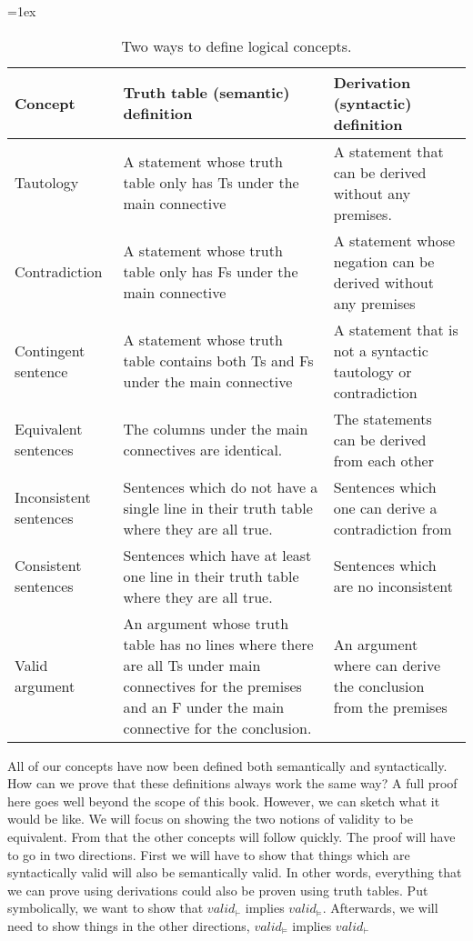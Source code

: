 \begin{sidewaystable}
\begin{mdframed}[style=mytablebox]
\tabulinesep=1ex
\begin{tabu}{X[.5,c,m] ||X[1,l,m] |X[1,l,m]}
\bf{Concept} 		&	\bf{Truth table (semantic) definition} 	&	\bf{Derivation (syntactic) definition} \\ \hline \hline

Tautology  &	A statement whose truth table only has Ts under the main connective & A statement that can be derived without any premises.	 \\ \hline
 
Contradiction		&	A statement whose truth table only has Fs under the main connective  &	A statement whose negation can be derived without any premises\\ \hline

Contingent sentence	&	A statement whose truth table contains both Ts and Fs under the main connective & A statement that is not a syntactic tautology or contradiction \\ \hline

Equivalent sentences &	The columns under the main connectives are identical.& The statements can be derived from each other	\\ \hline

Inconsistent sentences	&	Sentences which do not have a single line in their truth table where they are all true.	& Sentences which one can derive a contradiction from \\ \hline

Consistent sentences	&	Sentences which have at least one line in their truth table where they are all true. & Sentences which are no inconsistent	\\ \hline

Valid argument		&	An argument whose truth table has no lines where there are all Ts under main connectives for the premises and an F under the main connective for the conclusion.  & An argument where can derive the conclusion from the premises	\\ 
\end{tabu}
\end{mdframed}
\caption{Two ways to define logical concepts.}
\label{table:truth_tables_or_derivations}
\end{sidewaystable}

All of our concepts have now been defined both semantically and syntactically. How can we prove that these definitions always work the same way? A full proof here goes well beyond the scope of this book. However, we can sketch what it would be like. We will focus on showing the two notions of validity to be equivalent.  From that the other concepts will follow quickly. The proof will have to go in two directions. First we will have to show that things which are syntactically valid will also be semantically valid. In other words, everything that we can prove using derivations could also be proven using truth tables. Put symbolically, we want to show that $valid_{\vdash}$ implies $valid_{\models}$. Afterwards, we will need to show things in the other directions,  $valid_{\models}$ implies $valid_{\vdash}$

